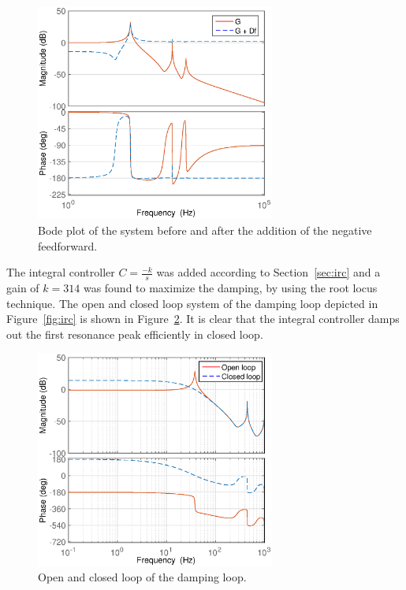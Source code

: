 \begin{figure}[h!]
  \centering
  \includegraphics[width=0.7\textwidth]{fig/matlab/bodeafterfeedf.eps}
  \caption{\label{fig:bodeafterfeedf} Bode plot of the system before and after the addition of the negative feedforward.}
\end{figure}

\FloatBarrier
The integral controller $C=\frac{-k}{s}$ was added according to Section~\ref{sec:irc} and a gain of $k=314$ was found to maximize the damping, by using the root locus technique.
The open and closed loop system of the \abbrIRC damping loop depicted in Figure~\ref{fig:irc} is shown in Figure~\ref{fig:bodedamped}. It is clear that the integral controller damps out the first resonance peak efficiently in closed loop.

\begin{figure}[h!]
  \centering
  \includegraphics[width=0.7\textwidth]{fig/matlab/bodedamped.eps}
  \caption{\label{fig:bodedamped} Open and closed loop of the \abbrIRC damping loop.}
\end{figure}


